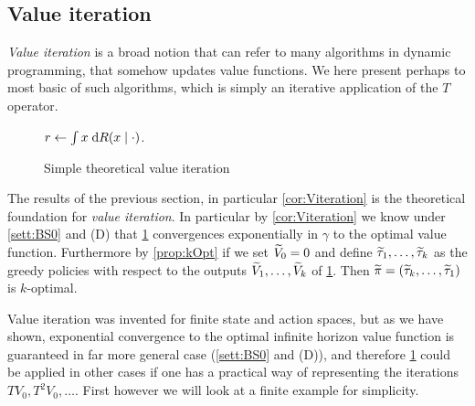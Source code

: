 \subsection{Value iteration}

\emph{Value iteration} is a broad notion that can refer to many algorithms
in dynamic programming, that somehow updates value functions.
We here present perhaps to most basic of such algorithms, which is simply
an iterative application of the $T$ operator.

\begin{figure}[H]
  \begin{algorithm}[H] %
    \caption{Simple theoretical value iteration}
    $r \leftarrow \int x \; \mathrm{d} R(x \mid \cdot)$.


  \label{alg:valueIteration}
  \end{algorithm}
\end{figure}

The results of the previous section, in particular \cref{cor:Viteration}
is the theoretical foundation for
\emph{value iteration}.
In particular by \cref{cor:Viteration} we know under \cref{sett:BS0} and (D)
that \cref{alg:valueIteration}
convergences exponentially in $\gamma$ to the optimal value function.
Furthermore by \cref{prop:kOpt} if we set $\widetilde{V}_0 = 0$ and define
$\widetilde{\tau}_1, \dots, \widetilde{\tau}_k$ as the greedy policies with respect to
the outputs
$\widetilde{V}_1, \dots, \widetilde{V}_k$ of \cref{alg:valueIteration}. Then
$\widetilde{\pi} = (\widetilde{\tau}_k, \dots, \widetilde{\tau}_1)$ is $k$-optimal.

Value iteration was invented for finite state
and action spaces, but as we have shown, exponential convergence to the optimal
infinite horizon value function is guaranteed in far more general case
(\cref{sett:BS0} and (D)), and therefore \cref{alg:valueIteration} could be
applied in other cases if one has a practical way of representing the iterations
$TV_0, T^2V_0, \dots$. First however we will look at a finite example
for simplicity.


